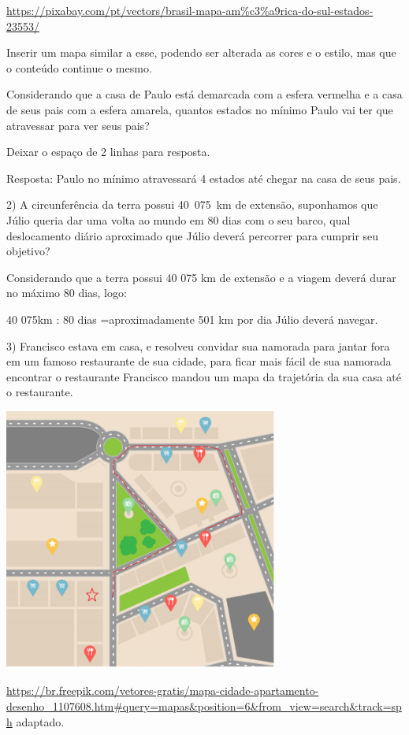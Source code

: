 \url{https://pixabay.com/pt/vectors/brasil-mapa-am\%c3\%a9rica-do-sul-estados-23553/}

Inserir um mapa similar a esse, podendo ser alterada as cores e o
estilo, mas que o conteúdo continue o mesmo.

Considerando que a casa de Paulo está demarcada com a esfera vermelha e
a casa de seus pais com a esfera amarela, quantos estados no mínimo
Paulo vai ter que atravessar para ver seus pais?

Deixar o espaço de 2 linhas para resposta.

Resposta: Paulo no mínimo atravessará 4 estados até chegar na casa de
seus pais.

2) A circunferência da terra possui 40~075~km de extensão, suponhamos
que Júlio queria dar uma volta ao mundo em 80 dias com o seu barco, qual
deslocamento diário aproximado que Júlio deverá percorrer para cumprir
seu objetivo?

Considerando que a terra possui 40 075 km de extensão e a viagem deverá
durar no máximo 80 dias, logo:

40 075km : 80 dias =aproximadamente 501 km por dia Júlio deverá navegar.

3) Francisco estava em casa, e resolveu convidar sua namorada para
jantar fora em um famoso restaurante de sua cidade, para ficar mais
fácil de sua namorada encontrar o restaurante Francisco mandou um mapa
da trajetória da sua casa até o restaurante.

\includegraphics[width=3.55in,height=3.406in]{./imgSAEB_8_MAT/media/image37.png}

\url{https://br.freepik.com/vetores-gratis/mapa-cidade-apartamento-desenho_1107608.htm\#query=mapas\&position=6\&from_view=search\&track=sph}
adaptado.

